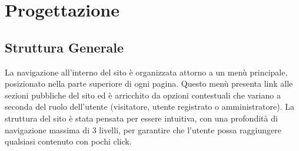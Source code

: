 \section{Progettazione}
\subsection{Struttura Generale}
La navigazione all'interno del sito è organizzata attorno a un menù principale, posizionato nella parte superiore di ogni pagina. Questo menù presenta link alle sezioni pubbliche del sito ed è arricchito da opzioni contestuali che variano a seconda del ruolo dell'utente (visitatore, utente registrato o amministratore).
La struttura del sito è stata pensata per essere intuitiva, con una profondità di navigazione massima di 3 livelli, per garantire che l'utente possa raggiungere qualsiasi contenuto con pochi click.

